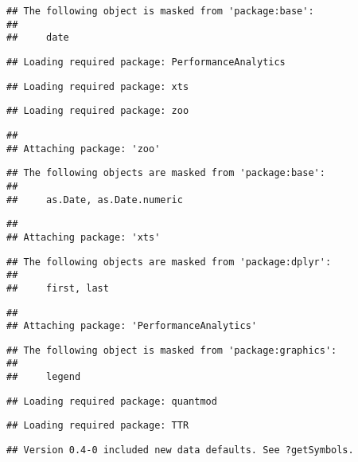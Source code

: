 \documentclass[]{article}
\begin{document}
\begin{verbatim}
## The following object is masked from 'package:base':
## 
##     date
\end{verbatim}

\begin{verbatim}
## Loading required package: PerformanceAnalytics
\end{verbatim}

\begin{verbatim}
## Loading required package: xts
\end{verbatim}

\begin{verbatim}
## Loading required package: zoo
\end{verbatim}

\begin{verbatim}
## 
## Attaching package: 'zoo'
\end{verbatim}

\begin{verbatim}
## The following objects are masked from 'package:base':
## 
##     as.Date, as.Date.numeric
\end{verbatim}

\begin{verbatim}
## 
## Attaching package: 'xts'
\end{verbatim}

\begin{verbatim}
## The following objects are masked from 'package:dplyr':
## 
##     first, last
\end{verbatim}

\begin{verbatim}
## 
## Attaching package: 'PerformanceAnalytics'
\end{verbatim}

\begin{verbatim}
## The following object is masked from 'package:graphics':
## 
##     legend
\end{verbatim}

\begin{verbatim}
## Loading required package: quantmod
\end{verbatim}

\begin{verbatim}
## Loading required package: TTR
\end{verbatim}

\begin{verbatim}
## Version 0.4-0 included new data defaults. See ?getSymbols.
\end{verbatim}
\end{document}
